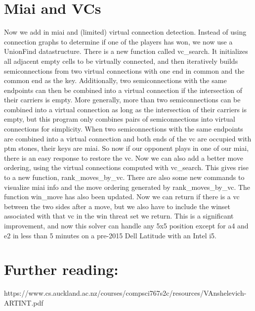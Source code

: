 \documentclass{article}
\begin{document}
\section*{Miai and VCs}
Now we add in miai and (limited) virtual connection detection. Instead of using connection graphs to determine if one of the players has won, we now use a UnionFind datastructure. There is a new function called vc\_search. It initializes all adjacent empty cells to be virtually connected, and then iteratively builds semiconnections from two virtual connections with one end in common and the common end as the key. Additionally, two semiconnections with the same endpoints can then be combined into a virtual connection if the intersection of their carriers is empty. More generally, more than two semiconnections can be combined into a virtual connection as long as the intersection of their carriers is empty, but this program only combines pairs of semiconnections into virtual connections for simplicity. When two semiconnections with the same endpoints are combined into a virtual connection and both ends of the vc are occupied with ptm stones, their keys are miai. So now if our opponent plays in one of our miai, there is an easy response to restore the vc. Now we can also add a better move ordering, using the virtual connections computed with vc\_search. This gives rise to a new function, rank\_moves\_by\_vc. There are also some new commands to visualize miai info and the move ordering generated by rank\_moves\_by\_vc. The function win\_move has also been updated. Now we can return if there is a vc between the two sides after a move, but we also have to include the winset associated with that vc in the win threat set we return. This is a significant improvement, and now this solver can handle any 5x5 position except for a4 and e2 in less than 5 minutes on a pre-2015 Dell Latitude with an Intel i5.
\section*{Further reading:}
	https://www.cs.auckland.ac.nz/courses/compsci767s2c/resources/VAnshelevich-ARTINT.pdf
\end{document}
